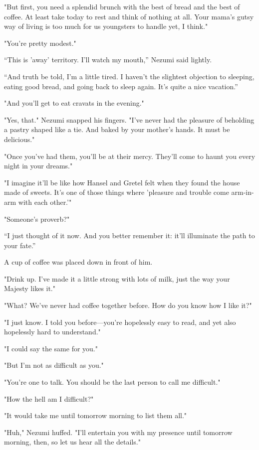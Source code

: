 "But first, you need a splendid brunch with the best of bread and the
best of coffee. At least take today to rest and think of nothing at all.
Your mama's gutsy way of living is too much for us youngsters to handle
yet, I think."

"You're pretty modest."

``This is 'away' territory. I'll watch my mouth,'' Nezumi said lightly.~

``And truth be told, I'm a little tired. I haven't the slightest
objection to sleeping, eating good bread, and going back to sleep again.
It's quite a nice vacation.''

"And you'll get to eat cravats in the evening."

"Yes, that." Nezumi snapped his fingers. "I've never had the pleasure of
beholding a pastry shaped like a tie. And baked by your mother's hands.
It must be delicious."

"Once you've had them, you'll be at their mercy. They'll come to haunt
you every night in your dreams."

"I imagine it'll be like how Hansel and Gretel felt when they found the
house made of sweets. It's one of those things where 'pleasure and
trouble come arm-in-arm with each other.'"

"Someone's proverb?"

``I just thought of it now. And you better remember it: it'll illuminate
the path to your fate.''

A cup of coffee was placed down in front of him.

"Drink up. I've made it a little strong with lots of milk, just the way
your Majesty likes it."

"What? We've never had coffee together before. How do you know how I
like it?"

"I just know. I told you before---you're hopelessly easy to read, and yet
also hopelessly hard to understand."

"I could say the same for you."

"But I'm not as difficult as you."

"You're one to talk. You should be the last person to call me
difficult."

"How the hell am I difficult?"

"It would take me until tomorrow morning to list them all."

"Huh," Nezumi huffed. "I'll entertain you with my presence until
tomorrow morning, then, so let us hear all the details."

